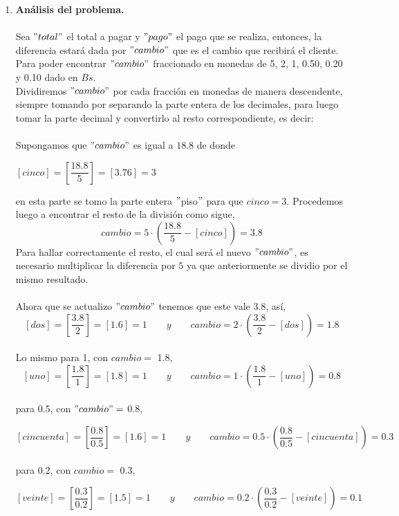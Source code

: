 \begin{enumerate}
\begin{enumerate}[\bfseries a)]
    \item \textbf{Análisis del problema.}\\\\
	Sea $" total "$ el total a pagar y $"pago"$ el pago que se realiza, entonces, la diferencia estará dada por $"cambio"$ que es el cambio que recibirá el cliente.\\
	Para poder encontrar  $"cambio"$ fraccionado en monedas de 5, 2, 1, 0.50, 0.20 y 0.10 dado en $Bs.$\\ Dividiremos $"cambio"$ por cada fracción en monedas de manera descendente, siempre tomando por separando la parte entera de los decimales, para luego tomar la parte decimal y convertirlo al resto correspondiente,  es decir:\\\\
	Supongamos que $"cambio"$ es igual a $18.8$ de donde
	\begin{center} $[cinco] = \left[\dfrac{18.8}{5}\right] = [3.76] = 3$\end{center}  
	    en esta parte se tomo la parte entera $"$piso$"$ para que $cinco=3$. Procedemos luego a encontrar el resto de la división como sigue, $$cambio=5\cdot\left(\dfrac{18.8}{5}-[cinco] \right) = 3.8$$
	    Para hallar correctamente el resto, el cual será el nuevo $"cambio"$, es necesario multiplicar la diferencia por $5$ ya que anteriormente se dividio por el mismo resultado.\\\\
	    Ahora que se actualizo $"cambio"$ tenemos que este vale 3.8, así,
	    $$[dos] = \left[\dfrac{3.8}{2}\right] = [1.6] = 1 \qquad y \qquad cambio = 2\cdot\left(\dfrac{3.8}{2} - [dos]\right) = 1.8$$\\
	    Lo mismo  para 1, con $cambio =$ 1.8,
	    $$\left[uno\right] = \left[\dfrac{1.8}{1}\right] = \left[1.8\right] = 1 \qquad y \qquad cambio = 1 \cdot \left(\dfrac{1.8}{1} - [uno]\right) = 0.8$$\\
	    para 0.5, con $"cambio" =$ 0.8,

	    $$\left[cincuenta\right] = \left[\dfrac{0.8}{0.5}\right] = \left[1.6\right] = 1 \qquad y \qquad cambio = 0.5 \cdot \left(\dfrac{0.8}{0.5} - [cincuenta]\right) = 0.3$$\\
	    
	    para 0.2, con $cambio = $ 0.3,

	    $$\left[veinte\right] = \left[\dfrac{0.3}{0.2}\right] = \left[1.5\right] = 1 \qquad y \qquad cambio = 0.2 \cdot \left(\dfrac{0.3}{0.2} - [veinte]\right) = 0.1$$\\
    

\end{enumerate}
\end{enumerate}
